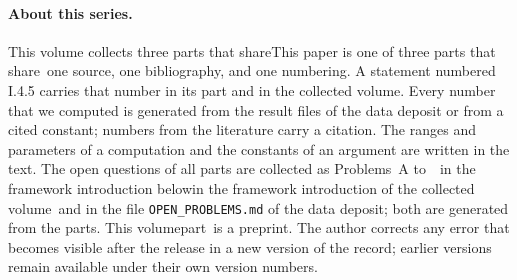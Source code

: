 %
\paragraph{About this series.}
\ifimband This volume collects three parts that share\else This paper is one of three parts that share\fi\ one source, one bibliography, and one numbering.
A statement numbered I.4.5 carries that number in its part and in the collected volume.
Every number that we computed is generated from the result files of the data deposit or from a cited constant; numbers from the literature carry a citation. The ranges and parameters of a computation and the constants of an argument are written in the text.
The open questions of all parts are collected as Problems~A to~\problemeletzter\ \ifimband in the framework introduction below\else in the framework
introduction of the collected volume\fi\ and in the file \texttt{OPEN\_PROBLEMS.md} of the data deposit; both are generated from the parts.
This \ifimband volume\else part\fi\ is a preprint. The author corrects any error that becomes visible after the release in a new version of the record; earlier versions remain available under their own version numbers.
